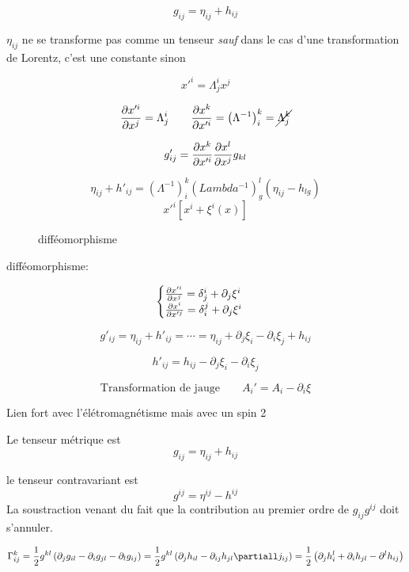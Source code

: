 \[ g_{ij} = \eta_{ij} + h_{ij} \]

$\eta_{ij}$ ne se transforme pas comme un tenseur \textit{sauf} dans le cas d'une transformation de Lorentz, c'est une constante sinon 

\begin{tcolorbox}[title=Transformation de Lorentz]
	\[ 	x'^i  = \Lambda_j^{i} x^{j} \]

	\[ \pdv{x'^{i}}{x^j} = \Lambda_j^{i} \qquad \pdv{x^{k}}{x'^i} = \left( \Lambda ^{-1} \right)_i^{k} = \cancel{\Lambda_j^{k}} \]

	\[ g_{ij} ' = \pdv{x^{k}}{x'^i} \pdv{x^{l}}{x^j} g_{kl}  \]

\[ \eta_{ij} + h'_{ij} = \left( \Lambda ^{-1}\right)_i^{k} \left( Lambda ^{-1} \right)_g^{l} \left(  \eta_{ij} - h_{lg}   \right)     \]
\[ x'^i [ x^{i}+ \xi^{i}(x) ] \]
	 
\end{tcolorbox}



\begin{figure}[ht]
    \centering
    \caption{difféomorphisme}
    \label{fig:difféomorphisme}
\end{figure}

difféomorphisme:

\[ \begin{cases}
	\pdv{x'^i}{x^j}  = \delta_j^{i} + \partial	_j \xi^{i}\\
	\pdv{x^{i}}{x'^j} = \delta_i^{j} + \partial_j \xi^{i}
 \end{cases} \]

 \[ g'_{ij} = \eta_{ij} + h'_{ij} = \dotsb = \eta_{ij} + \partial_j \xi_i - \partial_i \xi_j +h_{ij}  \]

 \[ \boxed{h'_{ij} = h_{ij} - \partial_j \xi_i -\partial_i \xi_j} \]


\[ \text{Transformation de jauge}\qquad A_{i}' = A_i - \partial_i \xi    \]

Lien fort avec l'élétromagnétisme mais avec un spin 2

Le tenseur métrique est \[ g_{ij} = \eta_{ij} + h_{ij}  \]

le tenseur contravariant est \[ g^{ij} = \eta^{ij}- h^{ij} \] 
La soustraction venant du fait que la contribution au premier ordre de $	g_{ij} g^{ij} $ doit s'annuler.


\[ \Gamma_{ij}^{k} = \frac{1}{2} g^{kl}\left( \partial_j g_{il} - \partial_i g_{jl} - \partial_l g_{ij}  \right) = \frac{1}{2} g^{kl}\left( \partial_j h_{il} -\partial_{ij} h_{jl} \partiall j_{ij}\right)  = \frac{1}{2} \left( \partial_j h_i^{l} + \partial_i h_{jl	} - \partial^{l}h_{ij}  \right)    \]


